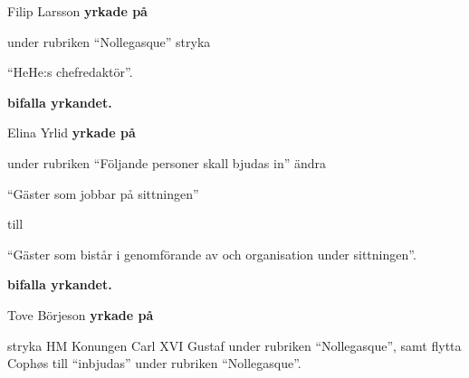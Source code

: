 \documentclass[10pt]{article}
\begin{document}
\begin{paragrafer}
\begin{paragrafer}




        Filip Larsson \textbf{yrkade på}
        \begin{attsatser}
          \att under rubriken ``Nollegasque'' stryka
          \begin{dashlist} 
            \item ``HeHe:s chefredaktör''.
          \end{dashlist} 
        \end{attsatser}
         
        \textbf{\Mba bifalla yrkandet.}

        Elina Yrlid \textbf{yrkade på}
        \begin{attsatser}
          \att under rubriken ``Följande personer skall bjudas in'' ändra
            \begin{dashlist} 
              \item “Gäster som jobbar på sittningen” 
            \end{dashlist}

            till

            \begin{dashlist} 
             \item “Gäster som bistår i genomförande av och organisation under sittningen”.
            \end{dashlist}
        \end{attsatser}

        \textbf{\Mba bifalla yrkandet.}

        Tove Börjeson \textbf{yrkade på}
        \begin{attsatser}
          \att stryka HM Konungen Carl XVI Gustaf under rubriken ``Nollegasque'', samt
          \att flytta Cophøs till ``inbjudas'' under rubriken ``Nollegasque''.
        \end{attsatser}


\end{paragrafer}
\end{paragrafer}
\end{document}
